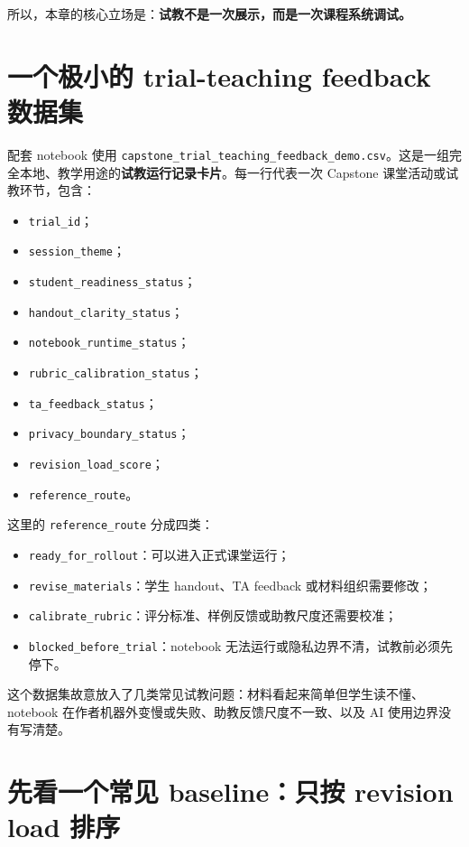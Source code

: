 所以，本章的核心立场是：\textbf{试教不是一次展示，而是一次课程系统调试。}

\section{一个极小的 trial-teaching feedback 数据集}

配套 notebook 使用 \nolinkurl{capstone_trial_teaching_feedback_demo.csv}。这是一组完全本地、教学用途的\textbf{试教运行记录卡片}。每一行代表一次 Capstone 课堂活动或试教环节，包含：

\begin{itemize}
    \item \texttt{trial\_id}；
    \item \texttt{session\_theme}；
    \item \texttt{student\_readiness\_status}；
    \item \texttt{handout\_clarity\_status}；
    \item \texttt{notebook\_runtime\_status}；
    \item \texttt{rubric\_calibration\_status}；
    \item \texttt{ta\_feedback\_status}；
    \item \texttt{privacy\_boundary\_status}；
    \item \texttt{revision\_load\_score}；
    \item \texttt{reference\_route}。
\end{itemize}

这里的 \texttt{reference\_route} 分成四类：

\begin{itemize}
    \item \texttt{ready\_for\_rollout}：可以进入正式课堂运行；
    \item \texttt{revise\_materials}：学生 handout、TA feedback 或材料组织需要修改；
    \item \texttt{calibrate\_rubric}：评分标准、样例反馈或助教尺度还需要校准；
    \item \texttt{blocked\_before\_trial}：notebook 无法运行或隐私边界不清，试教前必须先停下。
\end{itemize}

这个数据集故意放入了几类常见试教问题：材料看起来简单但学生读不懂、notebook 在作者机器外变慢或失败、助教反馈尺度不一致、以及 AI 使用边界没有写清楚。

\section{先看一个常见 baseline：只按 revision load 排序}

